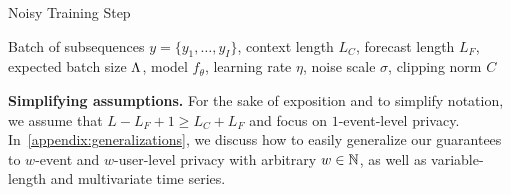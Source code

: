 \begin{algorithm}
   \caption{Noisy Training Step}
   \label{algorithm:dp-sgd-step}
\begin{algorithmic}
    Batch of subsequences $y = \{y_1,\dots,y_I\}$, context length $L_C$, forecast length $L_F$, expected batch size $\Lambda$,  model $f_\theta$, learning rate $\eta$, noise scale $\sigma$, clipping norm $C$
         \hfill {}
         \hfill {}
         \hfill {}
    \ENDFOR
\end{algorithmic}
\end{algorithm}

\textbf{Simplifying assumptions.} For the sake of exposition and to simplify notation, we assume that $L - L_F + 1 \geq L_C + L_F$  and focus on $1$-event-level privacy.
In~\cref{appendix:generalizations}, we discuss how to easily generalize our guarantees to $w$-event and $w$-user-level privacy with arbitrary $w \in {\mathbb{N}}$, as well as variable-length and multivariate time series.

